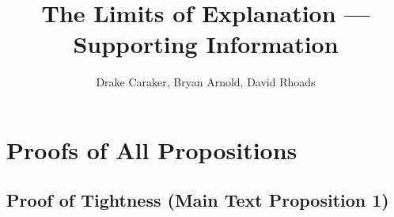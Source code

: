 \documentclass[11pt]{article}
\title{The Limits of Explanation --- Supporting Information}
\author{Drake Caraker, Bryan Arnold, David Rhoads}
\date{}
\begin{document}
\maketitle

\tableofcontents

\newpage

\section{Proofs of All Propositions}
\label{sec:si-proofs}

\subsection{Proof of Tightness (Main Text Proposition 1)}
\end{document}
